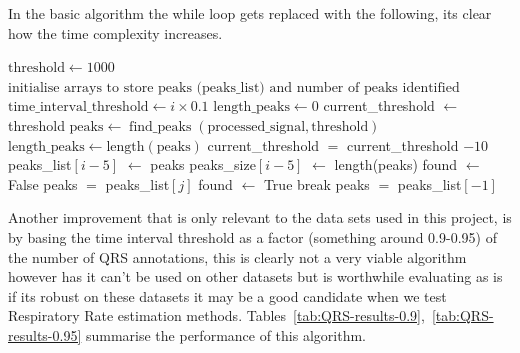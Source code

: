  In the basic algorithm the while loop gets replaced with the following, its clear how the time 
 complexity increases. 
\begin{algorithm}
\caption{Jump Based Modification to location of Processed Signals Peaks}
\begin{algorithmic}

    \State $\text{threshold} \gets 1000$
    \State $\text{initialise arrays to store peaks (peaks\_list) and
     number of peaks identified (peaks\_size)}$
        \State $\text{time\_interval\_threshold} \gets i \times 0.1$
        \State $\text{length\_peaks} \gets 0$
        \State current\_threshold $\gets$ threshold
                \State $\text{peaks} \gets \operatorname{\text{find\_peaks}}(\text{processed\_signal}, \text{threshold})$
                \State $\text{length\_peaks} \gets \text{length}(\text{peaks})$
                \State current\_threshold $=$ current\_threshold $-10$
        \EndWhile
        \State peaks\_list$[i-5]$ $\gets$ peaks
        \State peaks\_size$[i-5]$ $\gets$ length(peaks)
    \EndFor
    \State found $\gets$ False
                \State peaks $=$ peaks\_list$[j]$
                \State found $\gets$ True
                \State break
        \EndIf
    \EndFor
        peaks $=$ peaks\_list$[-1]$
    \EndIf

\end{algorithmic}
\end{algorithm}


Another improvement that is only relevant to the data sets used in this project, is by 
basing the time interval threshold as a factor (something around 0.9-0.95) of the number of QRS annotations, this is clearly not 
a very viable algorithm however has it can't be used on other datasets but is worthwhile 
evaluating as is if its robust on these datasets it may be a good candidate when 
we test Respiratory Rate estimation methods. Tables~\ref{tab:QRS-results-0.9},~\ref{tab:QRS-results-0.95}
 summarise the performance of this algorithm. 
\begin{table}[H]
    \centering
    \caption{Proportion of peaks detected for the annotation based algorithm with factor 0.90}
    \label{tab:QRS-results-0.9}
\end{table}
\begin{table}[H]
    \centering
    \caption{Proportion of peaks detected for the annotation based algorithm with factor 0.95}
    \label{tab:QRS-results-0.95}
\end{table}

